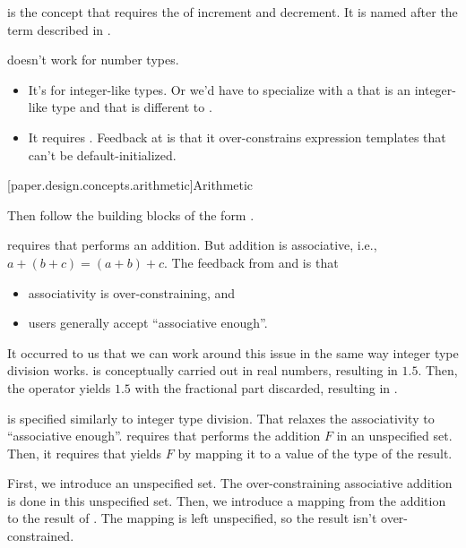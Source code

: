 \pnum
{} is the concept that requires the  of increment and decrement.
It is named after the term described in .
\begin{note}
 doesn't work for number types.
\begin{itemize}
\item
It's for integer-like types.
Or we'd have to specialize 
with a  that is an integer-like type
and that is different to .
\item
It requires .
Feedback at \hrefVII{} is that it over-constrains expression templates that can't be default-initialized.
\end{itemize}
\end{note}

[paper.design.concepts.arithmetic]{Arithmetic}

\pnum
Then follow the building blocks of the form .

\pnum
{} requires that \tcode{+} performs an addition.
But addition is associative, i.e., $a + (b + c) = (a + b) + c$.
The feedback from  and \hrefVI{} is that
\begin{itemize}
\item associativity is over-constraining, and
\item users generally accept ``associative enough''.
\end{itemize}

\pnum
It occurred to us that we can work around this issue in the same way integer type division works.
 is conceptually carried out in real numbers, resulting in $1.5$.
Then, the operator \tcode{/} yields $1.5$ with the fractional part discarded, resulting in .

\pnum
{} is specified similarly to integer type division.
That relaxes the associativity to ``associative enough''.
 requires that  performs the addition $F$ in an unspecified set.
Then, it requires that \tcode{+} yields $F$ by mapping it to a value of the type of the result.

\pnum
First, we introduce an unspecified set.
The over-constraining associative addition is done in this unspecified set.
Then, we introduce a mapping from the addition to the result of \tcode{+}.
The mapping is left unspecified, so the result isn't over-constrained.

